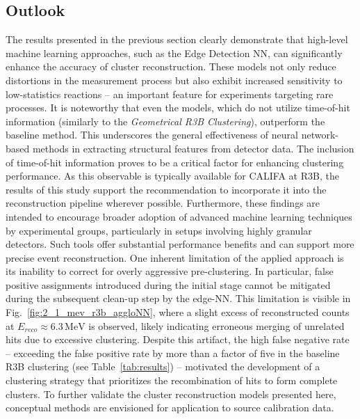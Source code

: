 \subsection{Outlook}\label{sec:ml_califa_outlook}
The results presented in the previous section clearly demonstrate that high-level machine learning approaches, such as the Edge Detection NN, can significantly enhance the accuracy of cluster reconstruction. These models not only reduce distortions in the measurement process but also exhibit increased sensitivity to low-statistics reactions -- an important feature for experiments targeting rare processes.\newline
It is noteworthy that even the models, which do not utilize time-of-hit information (similarly to the \textit{Geometrical R3B Clustering}), outperform the baseline method. This underscores the general effectiveness of neural network-based methods in extracting structural features from detector data.\newline
The inclusion of time-of-hit information proves to be a critical factor for enhancing clustering performance. As this observable is typically available for CALIFA at R3B, the results of this study support the recommendation to incorporate it into the reconstruction pipeline wherever possible.\newline
Furthermore, these findings are intended to encourage broader adoption of advanced machine learning techniques by experimental groups, particularly in setups involving highly granular detectors. Such tools offer substantial performance benefits and can support more precise event reconstruction.\newline
One inherent limitation of the applied approach is its inability to correct for overly aggressive pre-clustering. In particular, false positive assignments introduced during the initial stage cannot be mitigated during the subsequent clean-up step by the edge-NN. This limitation is visible in Fig.~\ref{fig:2_1_mev_r3b_aggloNN}, where a slight excess of reconstructed counts at \(E_{reco} \approx 6.3\,\mathrm{MeV}\) is observed, likely indicating erroneous merging of unrelated hits due to excessive clustering. Despite this artifact, the high false negative rate -- exceeding the false positive rate by more than a factor of five in the baseline R3B clustering (see Table~\ref{tab:results}) -- motivated the development of a clustering strategy that prioritizes the recombination of hits to form complete clusters.\newline
To further validate the cluster reconstruction models presented here, conceptual methods are envisioned for application to source calibration data.\newline
